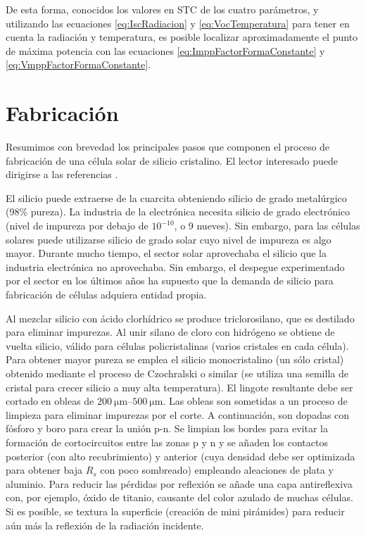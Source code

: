 De esta forma, conocidos los valores en STC de los cuatro parámetros,
y utilizando las ecuaciones \ref{eq:IscRadiacion} y \ref{eq:VocTemperatura}
para tener en cuenta la radiación y temperatura, es posible localizar
aproximadamente el punto de máxima potencia con las ecuaciones \ref{eq:ImppFactorFormaConstante}
y \ref{eq:VmppFactorFormaConstante}.


\section{Fabricación}

Resumimos con brevedad los principales pasos que componen el proceso
de fabricación de una célula solar de silicio cristalino. El lector
interesado puede dirigirse a las referencias \cite{Luque.Hegedus2003,Castaner.Markvart2003,Green1995}.

El silicio puede extraerse de la cuarcita obteniendo silicio de grado
metalúrgico (98\% pureza). La industria de la electrónica necesita
silicio de grado electrónico (nivel de impureza por debajo de $10^{-10}$,
o 9 nueves). Sin embargo, para las células solares puede utilizarse
silicio de grado solar cuyo nivel de impureza es algo mayor. Durante
mucho tiempo, el sector solar aprovechaba el silicio que la industria
electrónica no aprovechaba. Sin embargo, el despegue experimentado
por el sector en los últimos años ha supuesto que la demanda de silicio
para fabricación de células adquiera entidad propia.

Al mezclar silicio con ácido clorhídrico se produce triclorosilano,
que es destilado para eliminar impurezas. Al unir silano de cloro
con hidrógeno se obtiene de vuelta silicio, válido para células policristalinas
(varios cristales en cada célula). Para obtener mayor pureza se emplea
el silicio monocristalino (un sólo cristal) obtenido mediante el proceso
de Czochralski o similar (se utiliza una semilla de cristal para crecer
silicio a muy alta temperatura). El lingote resultante debe ser cortado
en obleas de $\SIrange[range-phrase=-]{200}{500}{\micro\meter}$. Las
obleas son sometidas a un proceso de limpieza para eliminar impurezas
por el corte. A continuación, son dopadas con fósforo y boro para
crear la unión p-n. Se limpian los bordes para evitar la formación
de cortocircuitos entre las zonas p y n y se añaden los contactos
posterior (con alto recubrimiento) y anterior (cuya densidad debe
ser optimizada para obtener baja $R_{s}$ con poco sombreado) empleando
aleaciones de plata y aluminio. Para reducir las pérdidas por reflexión
se añade una capa antireflexiva con, por ejemplo, óxido de titanio,
causante del color azulado de muchas células. Si es posible, se textura
la superficie (creación de mini pirámides) para reducir aún más la
reflexión de la radiación incidente.


